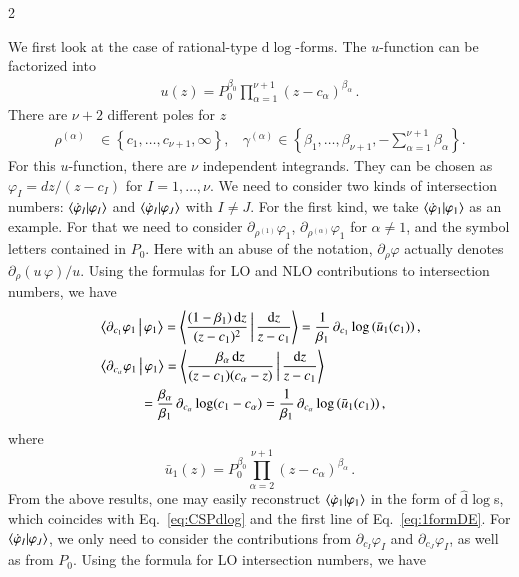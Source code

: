 \documentclass[fleqn]{2023SCGE}
\newcommand{\nn}{\nonumber}
\newcommand{\nd}{\mathrm{d}}
\newcommand{\nds}{\hat{\mathrm{d}}}
\begin{document}
\begin{multicols}{2}
\begin{appendix}
We first look at the case of rational-type $\nd\log$-forms. The $u$-function can be factorized into
\begin{align}
	u(z) = P_0^{\beta_0} \prod_{\alpha=1}^{\nu+1} (z-c_\alpha)^{\beta_\alpha} \,.
\end{align}
There are $\nu+2$ different poles for $z$
\begin{align}
    \rho^{(\alpha)} &\in \left\{ c_1, \ldots, c_{\nu+1}, \infty \right\} , ~~~~
    \gamma^{(\alpha)} \in \left\{ \beta_1, \ldots, \beta_{\nu+1}, -\sum_{\alpha=1}^{\nu+1} \beta_\alpha \right\} .
\end{align}
For this $u$-function, there are $\nu$ independent integrands. They can be chosen as $\varphi_I = dz/(z-c_I)$ for $I=1,\ldots,\nu$. We need to consider two kinds of intersection numbers: $\braket{\dot{\varphi}_I|\varphi_I}$ and $\braket{\dot{\varphi}_I|\varphi_J}$ with $I \neq J$. For the first kind, we take $\braket{\dot{\varphi}_1|\varphi_1}$ as an example. For that we need to consider $\partial_{\rho^{(1)}} \varphi_1$, $\partial_{\rho^{(\alpha)}} \varphi_1$ for $\alpha \neq 1$, and the symbol letters contained in $P_0$. Here with an abuse of the notation, $\partial_\rho \varphi$ actually denotes $\partial_\rho (u \, \varphi) / u$. Using the formulas for LO and NLO contributions to intersection numbers, we have
\begin{align}
    &\Braket{\partial_{c_1}\varphi_1|\varphi_1} = \Braket{ \frac{(1-\beta_1) \, \nd z}{(z-c_1)^2} | \frac{\nd z}{z-c_1} } = \frac{1}{\beta_1} \, \partial_{c_1} \log \left(\bar{u}_1(c_1)\right) , \nn
    \\
    &\Braket{\partial_{c_{\alpha}} \varphi_1|\varphi_1} = \Braket{\frac{\beta_\alpha \, \nd z}{(z-c_1)(c_\alpha-z)} | \frac{\nd z}{z-c_1}} \nn\\
    &\quad \quad \quad = \frac{\beta_\alpha}{\beta_1} \, \partial_{c_\alpha} \log (c_1-c_\alpha) = \frac{1}{\beta_1} \, \partial_{c_\alpha} \log \left(\bar{u}_1(c_1)\right) ,
\end{align}
where
\begin{equation}
    \bar{u}_1(z) = P_0^{\beta_0} \prod_{\alpha=2}^{\nu+1} (z-c_\alpha)^{\beta_\alpha} \,.
\end{equation}
From the above results, one may easily reconstruct $\braket{\dot{\varphi}_1|\varphi_1}$ in the form of $\nds \log$s, which coincides with Eq.~\eqref{eq:CSPdlog} and the first line of Eq.~\eqref{eq:1formDE}.
For $\braket{\dot{\varphi}_I|\varphi_J}$, we only need to consider the contributions from $\partial_{c_I}\varphi_I$ and $\partial_{c_J}\varphi_I$, as well as from $P_0$. Using the formula for LO intersection numbers, we have

\end{appendix}
\end{multicols}
\end{document}
